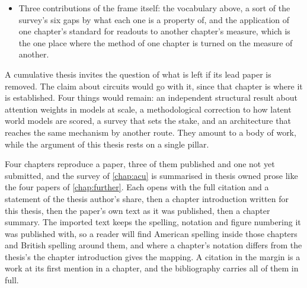 \begin{itemize}
    \item Three contributions of the frame itself: the vocabulary above, a
    sort of the survey's six gaps by what each one is a property of, and the
    application of one chapter's standard for readouts to another chapter's
    measure, which is the one place where the method of one chapter is turned
    on the measure of another.
\end{itemize}

A cumulative thesis invites the question of what is left if its lead paper is
removed. The claim about circuits would go with it, since that chapter is
where it is established. Four things would remain: an independent structural
result about attention weights in models at scale, a methodological correction
to how latent world models are scored, a survey that sets the stake, and an
architecture that reaches the same mechanism by another route. They amount to
a body of work, while the argument of this thesis rests on a single pillar.

Four chapters reproduce a paper, three of them published and one not yet
submitted, and the survey of
\cref{chap:acu} is summarised in thesis owned prose like the four papers of
\cref{chap:further}. Each opens with the
full citation and a statement of the thesis author's share, then a chapter
introduction written for this thesis, then the paper's own text as it was
published, then a chapter summary. The imported text keeps the spelling,
notation and figure numbering it was published with, so a reader will find
American spelling inside those chapters and British spelling around them, and
where a chapter's notation differs from the thesis's the chapter introduction
gives the mapping. A citation in the margin is a work at its first mention in
a chapter, and the bibliography carries all of them in full.
